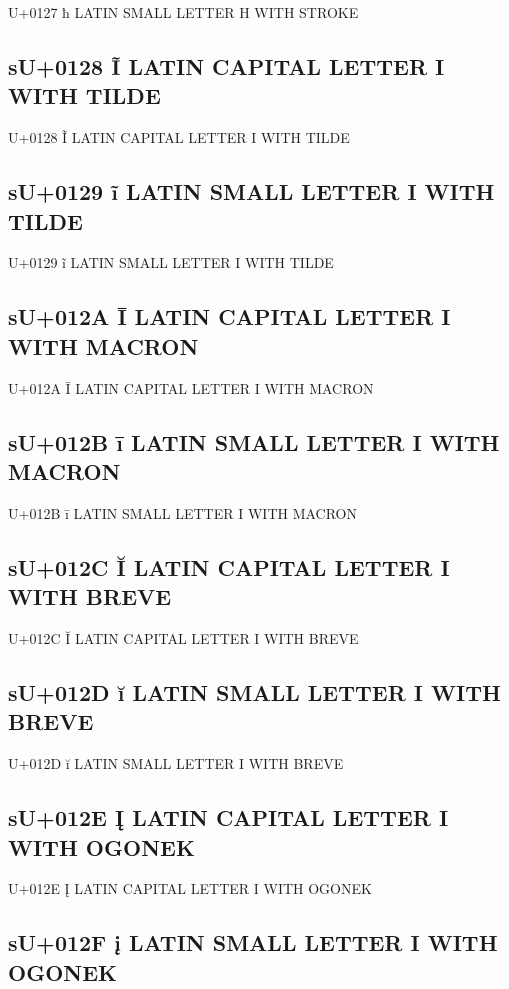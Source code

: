 U+0127 ħ LATIN SMALL LETTER H WITH STROKE

\subsection{sU+0128 Ĩ  LATIN CAPITAL LETTER I WITH TILDE}

U+0128 Ĩ  LATIN CAPITAL LETTER I WITH TILDE

\subsection{sU+0129 ĩ  LATIN SMALL LETTER I WITH TILDE}

U+0129 ĩ  LATIN SMALL LETTER I WITH TILDE

\subsection{sU+012A Ī  LATIN CAPITAL LETTER I WITH MACRON}

U+012A Ī  LATIN CAPITAL LETTER I WITH MACRON

\subsection{sU+012B ī  LATIN SMALL LETTER I WITH MACRON}

U+012B ī  LATIN SMALL LETTER I WITH MACRON

\subsection{sU+012C Ĭ  LATIN CAPITAL LETTER I WITH BREVE}

U+012C Ĭ  LATIN CAPITAL LETTER I WITH BREVE

\subsection{sU+012D ĭ  LATIN SMALL LETTER I WITH BREVE}

U+012D ĭ  LATIN SMALL LETTER I WITH BREVE

\subsection{sU+012E Į  LATIN CAPITAL LETTER I WITH OGONEK}

U+012E Į  LATIN CAPITAL LETTER I WITH OGONEK

\subsection{sU+012F į  LATIN SMALL LETTER I WITH OGONEK}

